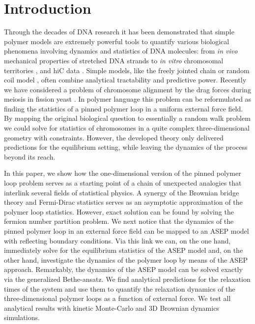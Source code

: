 \documentclass[aps,showpacs,twocolumn,floatfix,prx,superscriptaddress]{revtex4-1}
\begin{document}
\section{Introduction}
Through the decades of DNA research it has been demonstrated that simple polymer models are extremely powerful tools to quantify various biological phenomena involving dynamics and statistics of DNA molecules: from {\em in vivo} mechanical properties of stretched DNA strands \cite{} to {\em in vitro} chromosomal territories \cite{}, and hiC data \cite{}. Simple models, like the freely jointed chain or random coil model \cite{}, often combine analytical tractability and predictive power. Recently we have considered a problem of chromosome alignment by the drag forces during meiosis in fission yeast \cite{}. In polymer language this problem can be reformulated as finding the statistics of a pinned polymer loop in a uniform external force field. By mapping the original biological question to essentially a random walk problem we could solve for statistics of chromosomes in a quite complex three-dimensional geometry with constraints. However, the developed theory only delivered predictions for the equilibrium setting, while leaving the dynamics of the process beyond its reach. %

In this paper, we show how the one-dimensional version of the pinned polymer loop problem serves as a starting point of a chain of unexpected analogies that interlink several fields of statistical physics. A synergy of the Brownian bridge theory and Fermi-Dirac statistics serves as an asymptotic approximation of the polymer loop statistics. However, exact solution can be found by solving the fermion number partition problem. We next notice that the dynamics of the pinned polymer loop in an external force field can be mapped to an ASEP model with reflecting boundary conditions. Via this link we can, on the one hand, immediately solve for the equilibrium statistics of the ASEP model and, on the other hand, investigate the dynamics of the polymer loop by means of the ASEP approach. Remarkably, the dynamics of the ASEP model can be solved exactly via the generalized Bethe-ansatz. We find analytical predictions for the relaxation times of the system and use them to quantify the relaxation dynamics of the three-dimensional polymer loops as a function of external force. We test all analytical results with kinetic Monte-Carlo and 3D Brownian dynamics simulations. 
\end{document}
